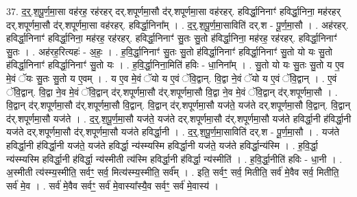 \documentclass[17pt]{extarticle}
\begin{document}
37. द॒र्॒.श॒पू॒र्ण॒मा॒सा वह॑रह॒ रह॑रहर् दर्.शपूर्णमा॒सौ द॑र्.शपूर्णमा॒सा वह॑रहर्. हविर्द्धा॒निनाꣳ॑ हविर्द्धा॒निना॒ मह॑रहर् दर्.शपूर्णमा॒सौ द॑र्.शपूर्णमा॒सा वह॑रहर्. हविर्द्धा॒निना᳚म् । . द॒र्॒.श॒पू॒र्ण॒मा॒साविति॑ दर्.श - पू॒र्ण॒मा॒सौ । . अह॑रहर्. हविर्द्धा॒निनाꣳ॑ हविर्द्धा॒निना॒ मह॑रह॒ रह॑रहर्. हविर्द्धा॒निनाꣳ॑ सु॒तः सु॒तो ह॑विर्द्धा॒निना॒ मह॑रह॒ रह॑रहर्. हविर्द्धा॒निनाꣳ॑ सु॒तः । . अह॑रह॒रित्यहः॑ - अ॒हः॒ । . ह॒वि॒र्द्धा॒निनाꣳ॑ सु॒तः सु॒तो ह॑विर्द्धा॒निनाꣳ॑ हविर्द्धा॒निनाꣳ॑ सु॒तो यो यः सु॒तो ह॑विर्द्धा॒निनाꣳ॑ हविर्द्धा॒निनाꣳ॑ सु॒तो यः । . ह॒वि॒र्द्धा॒निना॒मिति॑ हविः - धा॒निना᳚म् । . सु॒तो यो यः सु॒तः सु॒तो य ए॒व मे॒वं ॅयः सु॒तः सु॒तो य ए॒वम् । . य ए॒व मे॒वं ॅयो य ए॒वं ॅवि॒द्वान्. वि॒द्वा ने॒वं ॅयो य ए॒वं ॅवि॒द्वान् । . ए॒वं ॅवि॒द्वान्. वि॒द्वा ने॒व मे॒वं ॅवि॒द्वान् द॑र्.शपूर्णमा॒सौ द॑र्.शपूर्णमा॒सौ वि॒द्वा ने॒व मे॒वं ॅवि॒द्वान् द॑र्.शपूर्णमा॒सौ । . वि॒द्वान् द॑र्.शपूर्णमा॒सौ द॑र्.शपूर्णमा॒सौ वि॒द्वान्. वि॒द्वान् द॑र्.शपूर्णमा॒सौ यज॑ते॒ यज॑ते दर्.शपूर्णमा॒सौ वि॒द्वान्. वि॒द्वान् द॑र्.शपूर्णमा॒सौ यज॑ते । . द॒र्॒.श॒पू॒र्ण॒मा॒सौ यज॑ते॒ यज॑ते दर्.शपूर्णमा॒सौ द॑र्.शपूर्णमा॒सौ यज॑ते हविर्द्धा॒नी ह॑विर्द्धा॒नी यज॑ते दर्.शपूर्णमा॒सौ द॑र्.शपूर्णमा॒सौ यज॑ते हविर्द्धा॒नी । . द॒र्॒.श॒पू॒र्ण॒मा॒साविति॑ दर्.श - पू॒र्ण॒मा॒सौ । . यज॑ते हविर्द्धा॒नी ह॑विर्द्धा॒नी यज॑ते॒ यज॑ते हविर्द्धा॒ न्य॑स्म्यस्मि हविर्द्धा॒नी यज॑ते॒ यज॑ते हविर्द्धा॒न्य॑स्मि । . ह॒वि॒र्द्धा॒ न्य॑स्म्यस्मि हविर्द्धा॒नी ह॑विर्द्धा॒ न्य॑स्मीती त्य॑स्मि हविर्द्धा॒नी ह॑विर्द्धा॒ न्य॑स्मीति॑ । . ह॒वि॒र्द्धा॒नीति॑ हविः - धा॒नी । . अ॒स्मीती त्य॑स्म्य॒स्मीति॒ सर्वꣳ॒॒ सर्व॒ मित्य॑स्म्य॒स्मीति॒ सर्व᳚म् । . इति॒ सर्वꣳ॒॒ सर्व॒ मितीति॒ सर्व॑ मे॒वैव सर्व॒ मितीति॒ सर्व॑ मे॒व । . सर्व॑ मे॒वैव सर्वꣳ॒॒ सर्व॑ मे॒वास्या᳚स्यै॒व सर्वꣳ॒॒ सर्व॑ मे॒वास्य॑ । \newline
\end{document}
